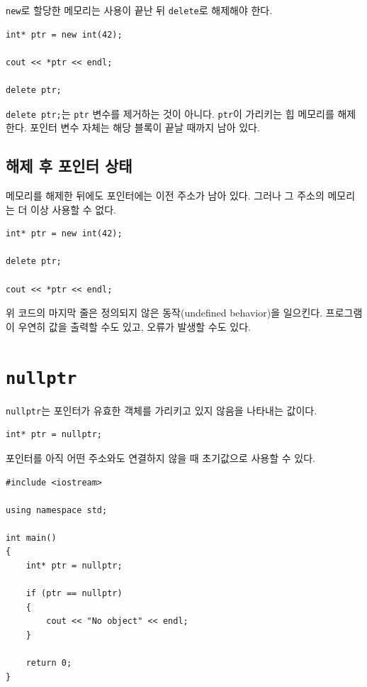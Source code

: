 \documentclass[11pt,a4paper]{article}
\begin{document}
\texttt{new}로 할당한 메모리는 사용이 끝난 뒤 \texttt{delete}로 해제해야 한다.

\begin{lstlisting}
int* ptr = new int(42);

cout << *ptr << endl;

delete ptr;
\end{lstlisting}

\texttt{delete ptr;}는 \texttt{ptr} 변수를 제거하는 것이 아니다.
\texttt{ptr}이 가리키는 힙 메모리를 해제한다.
포인터 변수 자체는 해당 블록이 끝날 때까지 남아 있다.

\subsection{해제 후 포인터 상태}

메모리를 해제한 뒤에도 포인터에는 이전 주소가 남아 있다.
그러나 그 주소의 메모리는 더 이상 사용할 수 없다.

\begin{lstlisting}
int* ptr = new int(42);

delete ptr;

cout << *ptr << endl;
\end{lstlisting}

위 코드의 마지막 줄은 정의되지 않은 동작(undefined behavior)을 일으킨다.
프로그램이 우연히 값을 출력할 수도 있고, 오류가 발생할 수도 있다.

\section{\texttt{nullptr}}

\texttt{nullptr}는 포인터가 유효한 객체를 가리키고 있지 않음을 나타내는 값이다.

\begin{lstlisting}
int* ptr = nullptr;
\end{lstlisting}

포인터를 아직 어떤 주소와도 연결하지 않을 때 초기값으로 사용할 수 있다.

\begin{lstlisting}
#include <iostream>

using namespace std;

int main()
{
    int* ptr = nullptr;

    if (ptr == nullptr)
    {
        cout << "No object" << endl;
    }

    return 0;
}
\end{lstlisting}
\end{document}
